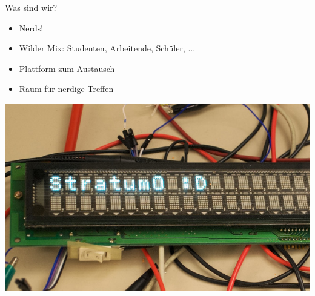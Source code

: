 \documentclass[fleqn,11pt,aspectratio=169]{beamer}
\begin{document}
\begin{frame}{Was sind wir?}
	\begin{multicols*}{2}
	\begin{block}{}
  \begin{itemize}
		\item Nerds!
		\item Wilder Mix: Studenten, Arbeitende, Schüler, ...
		\item Plattform zum Austausch
		\item Raum für nerdige Treffen
	\end{itemize}
	\end{block}
	\centering
	\includegraphics{stratum0_display.png}
\end{multicols*}
\end{frame}
\end{document}

